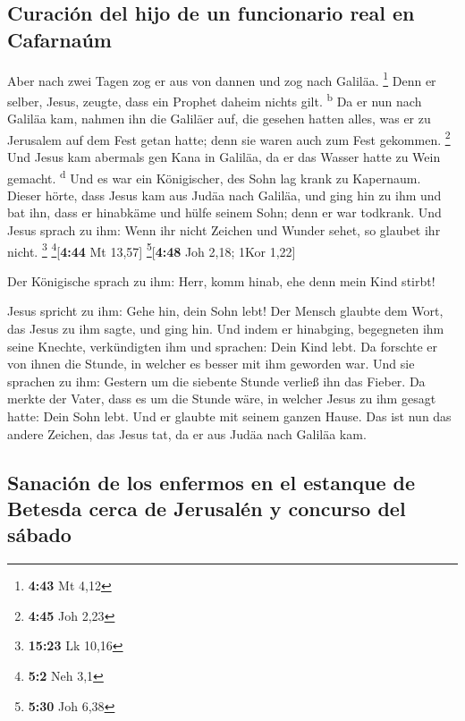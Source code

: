 \hypertarget{curaciuxf3n-del-hijo-de-un-funcionario-real-en-cafarnauxfam}{%
\subsection{Curación del hijo de un funcionario real en
Cafarnaúm}\label{curaciuxf3n-del-hijo-de-un-funcionario-real-en-cafarnauxfam}}

 Aber nach zwei Tagen zog er aus von dannen und zog nach
Galiläa. \footnote{\textbf{4:43} Mt 4,12}  Denn er
selber, Jesus, zeugte, dass ein Prophet daheim nichts gilt.
\textsuperscript{b}  Da er nun nach Galiläa kam, nahmen
ihn die Galiläer auf, die gesehen hatten alles, was er zu Jerusalem auf
dem Fest getan hatte; denn sie waren auch zum Fest gekommen. \footnote{\textbf{4:45}
  Joh 2,23}  Und Jesus kam abermals gen Kana in Galiläa,
da er das Wasser hatte zu Wein gemacht. \textsuperscript{d}
 Und es war ein Königischer, des Sohn lag krank zu
Kapernaum. Dieser hörte, dass Jesus kam aus Judäa nach Galiläa, und ging
hin zu ihm und bat ihn, dass er hinabkäme und hülfe seinem Sohn; denn er
war todkrank.  Und Jesus sprach zu ihm: Wenn ihr nicht
Zeichen und Wunder sehet, so glaubet ihr nicht. \footnote{\textbf{15:23}
  Lk 10,16} \footnote{\textbf{5:2} Neh 3,1}{[}\textbf{4:44} Mt 13,57{]}
\footnote{\textbf{5:30} Joh 6,38}{[}\textbf{4:48} Joh 2,18; 1Kor 1,22{]}

 Der Königische sprach zu ihm: Herr, komm hinab, ehe denn
mein Kind stirbt!

 Jesus spricht zu ihm: Gehe hin, dein Sohn lebt! Der
Mensch glaubte dem Wort, das Jesus zu ihm sagte, und ging hin.
 Und indem er hinabging, begegneten ihm seine Knechte,
verkündigten ihm und sprachen: Dein Kind lebt.  Da
forschte er von ihnen die Stunde, in welcher es besser mit ihm geworden
war. Und sie sprachen zu ihm: Gestern um die siebente Stunde verließ ihn
das Fieber.  Da merkte der Vater, dass es um die Stunde
wäre, in welcher Jesus zu ihm gesagt hatte: Dein Sohn lebt. Und er
glaubte mit seinem ganzen Hause.  Das ist nun das andere
Zeichen, das Jesus tat, da er aus Judäa nach Galiläa kam.

\hypertarget{sanaciuxf3n-de-los-enfermos-en-el-estanque-de-betesda-cerca-de-jerusaluxe9n-y-concurso-del-suxe1bado}{%
\subsection{Sanación de los enfermos en el estanque de Betesda cerca de
Jerusalén y concurso del
sábado}\label{sanaciuxf3n-de-los-enfermos-en-el-estanque-de-betesda-cerca-de-jerusaluxe9n-y-concurso-del-suxe1bado}}

